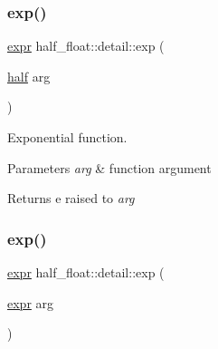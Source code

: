 \mbox{\label{namespacehalf__float_1_1detail_a22c1f76fc6a8dd8e469e54cabc4a7f42}} 
\subsubsection{\texorpdfstring{exp()}{exp()}\hspace{0.1cm}{\footnotesize\ttfamily [1/2]}}
{\footnotesize\ttfamily \hyperlink{structhalf__float_1_1detail_1_1expr}{expr} half\+\_\+float\+::detail\+::exp (\begin{DoxyParamCaption}\item[{\hyperlink{classhalf__float_1_1half}{half}}]{arg }\end{DoxyParamCaption})\hspace{0.3cm}{\ttfamily [inline]}}

Exponential function. 
\begin{DoxyParams}{Parameters}
{\em arg} & function argument \\
\hline
\end{DoxyParams}
\begin{DoxyReturn}{Returns}
e raised to {\itshape arg} 
\end{DoxyReturn}
\mbox{\label{namespacehalf__float_1_1detail_a09e538127fc0c503d11489a95f3edffd}} 
\subsubsection{\texorpdfstring{exp()}{exp()}\hspace{0.1cm}{\footnotesize\ttfamily [2/2]}}
{\footnotesize\ttfamily \hyperlink{structhalf__float_1_1detail_1_1expr}{expr} half\+\_\+float\+::detail\+::exp (\begin{DoxyParamCaption}\item[{\hyperlink{structhalf__float_1_1detail_1_1expr}{expr}}]{arg }\end{DoxyParamCaption})\hspace{0.3cm}{\ttfamily [inline]}}

\mbox{\label{namespacehalf__float_1_1detail_a6840d19bb305207e0bb01f47cb4fbe34}} 
